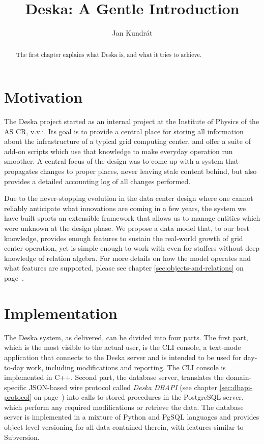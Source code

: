 \documentclass{article}
\begin{document}
\title{Deska: A Gentle Introduction}

\author{Jan Kundrát}

\maketitle

\begin{abstract}
The first chapter explains what Deska is, and what it tries to achieve.
\end{abstract}

\section{Motivation}

The Deska project started as an internal project at the Institute of Physics of the AS CR, v.v.i.  Its goal is to
provide a central place for storing all information about the infrastructure of a typical grid computing center, and
offer a suite of add-on scripts which use that knowledge to make everyday operation run smoother.  A central focus of
the design was to come up with a system that propagates changes to proper places, never leaving stale content behind,
but also provides a detailed accounting log of all changes performed.

Due to the never-stopping evolution in the data center design where one cannot reliably anticipate what innovations are
coming in a few years, the system we have built sports an extensible framework that allows us to manage entities which
were unknown at the design phase.  We propose a data model that, to our best knowledge, provides enough features to
sustain the real-world growth of grid center operation, yet is simple enough to work with even for staffers without deep
knowledge of relation algebra.  For more details on how the model operates and what features are supported, please see
chapter \ref{sec:objects-and-relations} on page~\pageref{sec:objects-and-relations}.

\section{Implementation}

The Deska system, as delivered, can be divided into four parts.  The first part, which is the most visible to the actual
user, is the CLI console, a text-mode application that connects to the Deska server and is intended to be used for
day-to-day work, including modifications and reporting.  The CLI console is implemented in C++.  Second part, the
database server, translates the domain-specific JSON-based wire protocol called {\em Deska DBAPI} (see chapter
\ref{sec:dbapi-protocol} on page~\pageref{sec:dbapi-protocol}) into calls to stored procedures in the PostgreSQL server,
which perform any required modifications or retrieve the data.  The database server is implemented in a mixture of
Python and PgSQL languages and provides object-level versioning for all data contained therein, with features similar to
Subversion.
\end{document}
